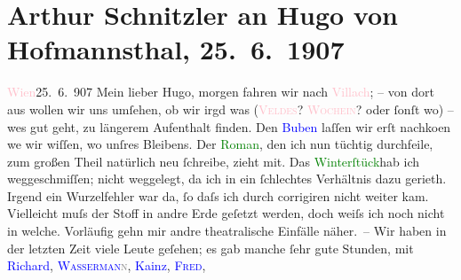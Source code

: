 

               \section[Arthur Schnitzler an Hugo von Hofmannsthal, 25. 6. 1907]{ Arthur Schnitzler an Hugo von Hofmannsthal, 25. 6. 1907}\nopagebreak{}\rehead{ }\normalsize\beginnumbering{} \toendnotes[C]{\smallbreak\pagebreak[2]} 
\toendnotes[C]{\smallbreak}\pstart
           \raggedleft{}{\pb}\textcolor{pink}{Wien}{}\ledrightnote{\textcolor{pink}{Wien}}{ }25. 6. 907\pend
           \pstart{}Mein lieber Hugo, \pend\pstart
           morgen fahren wir nach \textcolor{pink}{Villach}{}\ledrightnote{\textcolor{pink}{Villach}}; – von dort aus
               wollen wir uns umſehen, ob wir irgd was (\textsc{\textcolor{pink}{Veldes}{}\ledrightnote{\textcolor{pink}{Veldes}}? \textcolor{pink}{Wochein}{}\ledrightnote{\textcolor{pink}{Die Wochein}}}? oder
               ſonſt wo) – we{\geminationn}s gut geht, zu längerem Aufenthalt finden. Den \textcolor{blue}{Buben}{} laſſen wir erſt nachko{\geminationm}en we{\geminationn} wir wiſſen, wo
               unſres Bleibens. Der \textcolor{green}{Roman}{}, den
               ich nun tüchtig durchfeile, zum großen Theil natürlich neu ſchreibe, zieht mit. Das
                  \textcolor{green}{Winterſtück}{}hab ich weggeschmiſſen; nicht
               weggelegt, da ich in ein ſchlechtes Verhältnis dazu gerieth. Irgend ein Wurzelfehler
               war da, ſo daſs ich durch corrigiren nicht weiter kam. Vielleicht muſs der Stoff in
               andre Erde geſetzt werden, doch weiſs ich noch nicht in welche. Vorläufig gehn mir
               andre theatralische Einfälle näher. – Wir haben in der letzten Zeit viele Leute
               geſehen; es gab manche ſehr gute Stunden, mit \textcolor{blue}{Richard}{}\ledrightnote{\textcolor{blue}{Richard Beer-Hofmann}}, \textcolor{blue}{\textsc{Wasserman\textcolor{gray}{n}}}{}\ledrightnote{\textcolor{blue}{Jakob Wassermann}}, \textcolor{blue}{Kainz}{}\ledrightnote{\textcolor{blue}{Josef Kainz}}, \introOben{}\textcolor{blue}{\textsc{Fred}}{}\ledrightnote{\textcolor{blue}{W. Fred}},
